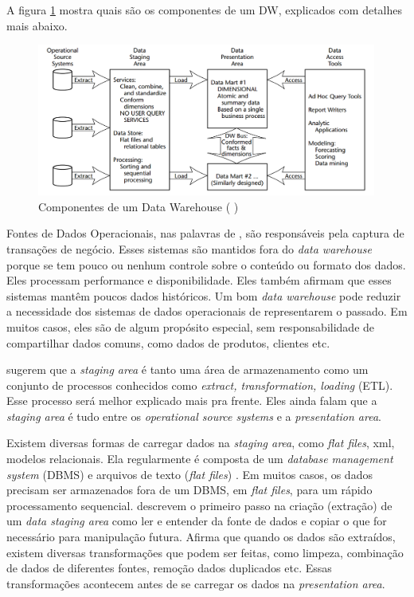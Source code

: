 A figura \ref{dwComponents} mostra quais são os componentes de um DW, explicados com detalhes mais abaixo.
\begin{figure}[H]
\centering
\includegraphics[height=5cm]{imagens/componentes_DW.png}
\caption{Componentes de um Data Warehouse (\citeauthor{kimball2002} \citeyear{kimball2002})}
\label{dwComponents}
\end{figure}

Fontes de Dados Operacionais, nas palavras de , são responsáveis pela captura de transações de negócio. Esses sistemas são mantidos fora do \textit{data warehouse} porque se tem pouco ou nenhum controle sobre o conteúdo ou formato dos dados. Eles processam performance e disponibilidade. Eles também afirmam que esses sistemas mantêm poucos dados históricos. Um bom \textit{data warehouse} pode reduzir a necessidade dos sistemas de dados operacionais de representarem o passado. Em muitos casos, eles são de algum propósito especial, sem responsabilidade de compartilhar dados comuns, como dados de produtos, clientes etc.

 sugerem que a \textit{staging area} é tanto uma área de armazenamento como um conjunto de processos conhecidos como \textit{extract, transformation, loading} (ETL). Esse processo será melhor explicado mais pra frente. Eles ainda falam que a \textit{staging area} é tudo entre os \textit{operational source systems} e a \textit{presentation area}. 

Existem diversas formas de carregar dados na \textit{staging area}, como \textit{flat files}, xml, modelos relacionais. Ela regularmente é composta de um \textit{database management system} (DBMS) e arquivos de texto (\textit{flat files}) \citep{kimball2004}. Em muitos casos, os dados precisam ser armazenados fora de um DBMS, em \textit{flat files}, para um rápido processamento sequencial.
 descrevem o primeiro passo na criação (extração) de um \textit{data staging area} como ler e entender da fonte de dados e copiar o que for necessário para manipulação futura. Afirma que quando os dados são extraídos, existem diversas transformações que podem ser feitas, como limpeza, combinação de dados de diferentes fontes, remoção dados duplicados etc. Essas transformações acontecem antes de se carregar os dados na \textit{presentation area}.

